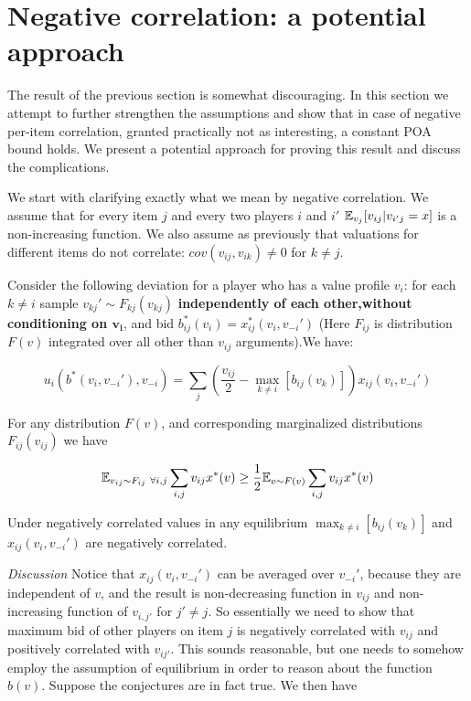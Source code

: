 \section{Negative correlation: a potential approach}
The result of the previous section is somewhat discouraging. In this section we attempt to further strengthen the assumptions and show that in case of negative per-item correlation, granted practically not as interesting, a constant POA bound holds. We present a potential approach for proving this result and discuss the complications.

We start with clarifying exactly what we mean by negative correlation. We assume that for every item $j$ and every two players $i$ and $i'$ ${\mathbb{E}}_{v_j}[v_{ij}|v_{i'j}=x]$ is a non-increasing function. We also assume as previously that valuations for different items do not correlate: $cov(v_{ij},v_{ik})\neq 0$ for $k\neq j$.

Consider the following deviation for a player who has a value profile $v_i$: for each $k\neq i$ sample $v_{kj}'\sim F_{kj}(v_{kj})$ \textbf{independently of each other,without conditioning on $\mathbf{v_i}$}, and bid $b_{ij}^*(v_i) = x^*_{ij}(v_i,v_{-i}')$ (Here $F_{ij}$ is distribution $F(v)$ integrated over all other than $v_{ij}$ arguments).We have:

$$u_i(b^*(v_i,v_{-i}'),v_{-i}) = \sum_j \left ( \frac{v_{ij}}{2}-\max_{k\neq i}[b_{ij}(v_k)]\right)x_{ij}(v_i,v_{-i}')$$


\begin{conjecture}
For any distribution $F(v)$, and corresponding marginalized distributions $F_{ij}(v_{ij})$ we have

$${\mathbb{E}}_{v_{ij}\sim F_{ij}\ \forall i,j} \sum_{i,j} v_{ij}x^*(v)\geq \frac{1}{2}{\mathbb{E}}_{v \sim F(v)}  \sum_{i,j} v_{ij}x^*(v)$$
\end{conjecture}



\begin{conjecture}
Under negatively correlated values in any equilibrium $\max_{k\neq i}[b_{ij}(v_k)]$ and $x_{ij}(v_i,v_{-i}')$ are negatively correlated.
\end{conjecture}

\textit{Discussion} Notice that $x_{ij}(v_i,v_{-i}')$ can be averaged over $v_{-i}'$, because they are independent of $v$, and the result is non-decreasing function in $v_{ij}$ and non-increasing function of $v_{i,j'}$ for $j'\neq j$. So essentially we need to show that maximum bid of other players on item $j$ is negatively correlated with $v_{ij}$ and positively correlated with $v_{ij'}$. This sounds reasonable, but one needs to somehow employ the assumption of equilibrium in order to reason about the function $b(v)$.
\bigskip
\newline Suppose the conjectures are in fact true. We then have

